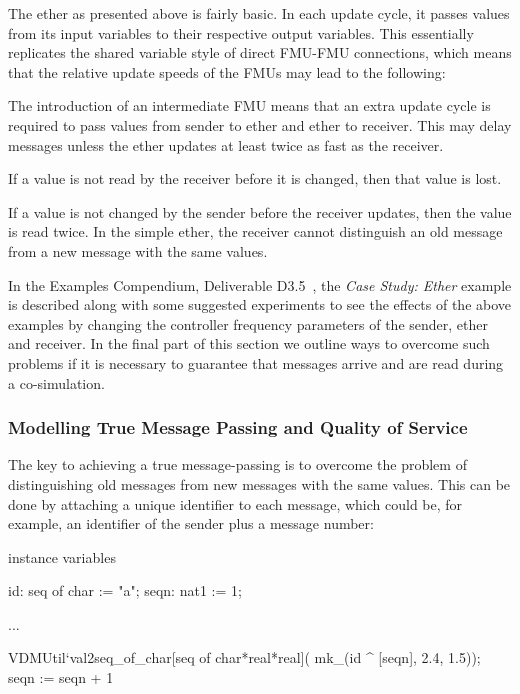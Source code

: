 The ether as presented above %
is fairly basic. In each update cycle, it passes values from its input variables to their respective output variables. This essentially replicates the shared variable style of direct FMU-FMU connections, which means that the relative update speeds of the FMUs may lead to the following:

\begin{description}[noitemsep]
  \item[Values may be delayed] The introduction of an intermediate FMU means that an extra update cycle is required to pass values from sender to ether and ether to receiver. This may delay messages unless the ether updates at least twice as fast as the receiver.
  \item[Values may not be read] If a value is not read by the receiver before it is changed, then that value is lost.
  \item[Values may be read more than once] If a value is not changed by the sender before the receiver updates, then the value is read twice. In the simple ether, the receiver cannot distinguish an old message from a new message with the same values.
\end{description}

In the Examples Compendium, Deliverable D3.5~\cite{INTOCPSD3.5}, the \emph{Case Study: Ether} example is described along with some suggested experiments to see the effects of the above examples by changing the controller frequency parameters of the sender, ether and receiver. In the final part of this section we outline ways to overcome such problems if it is necessary to guarantee that messages arrive and are read during a co-simulation.

\subsubsection{Modelling True Message Passing and Quality of Service}

The key to achieving a true message-passing is to overcome the problem of distinguishing old messages from new messages with the same values. This can be done by attaching a unique identifier to each message, which could be, for example, an identifier of the sender plus a message number:

\newpage
\begin{vdm}
instance variables

id: seq of char := "a";
seqn: nat1 := 1;

...

VDMUtil`val2seq_of_char[seq of char*real*real](
  mk_(id ^ [seqn], 2.4, 1.5));
seqn := seqn + 1
\end{vdm}

